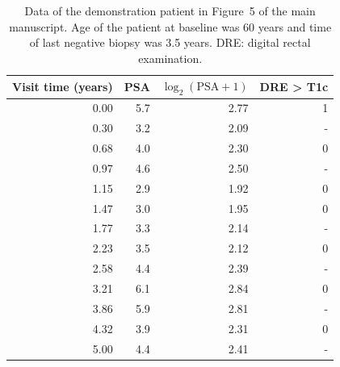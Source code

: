 \begin{table}[!htb]
\begin{center}
\caption{Data of the demonstration patient in Figure~5 of the main manuscript. Age of the patient at baseline was 60 years and time of last negative biopsy was 3.5 years. DRE: digital rectal examination.}
\label{tab:demo_patient}
\begin{tabular}{rrrr}
\hline
Visit time (years) & PSA & $\log_2(\mbox{PSA}+1)$ & DRE > T1c\\ 
\hline
0.00 & 5.7 & 2.77 &            1\\
0.30 & 3.2 & 2.09 &           -\\
0.68 & 4.0 & 2.30 &            0\\
0.97 & 4.6 & 2.50 &           -\\
1.15 & 2.9 & 1.92 &            0\\
1.47 & 3.0 & 1.95 &            0\\
1.77 & 3.3 & 2.14 &           -\\
2.23 & 3.5 & 2.12 &            0\\
2.58 & 4.4 & 2.39 &           -\\
3.21 & 6.1 & 2.84 &            0\\
3.86 & 5.9 & 2.81 &           -\\
4.32 & 3.9 & 2.31 &            0\\
5.00 & 4.4 & 2.41 &           -\\
\hline
\end{tabular}   
\end{center}
\end{table}


